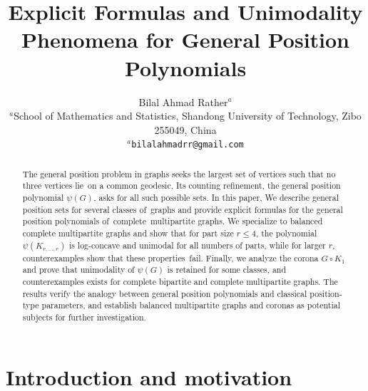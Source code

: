 \documentclass[12pt,twoside]{article}
\title{Explicit Formulas and Unimodality Phenomena for General Position Polynomials}
\author{
	{ Bilal Ahmad Rather$^{a}$} \\[2mm]
	\small $^{a}$School of Mathematics and Statistics, Shandong University of Technology, Zibo 255049, China\\
	$^{a}$\texttt{bilalahmadrr@gmail.com}
}
\date{}
\begin{document}
	\pagestyle{myheadings} 
\maketitle
	

	
	\begin{abstract}
		The general position problem in graphs seeks the largest set of vertices such that no three vertices lie on a common geodesic. Its counting refinement, the general position polynomial $\psi(G)$, asks for all such possible sets. In this paper, We describe general position sets for several classes of graphs and provide explicit formulas for the general position polynomials of complete multipartite graphs. We specialize to balanced complete multipartite graphs and show that for part size $r\le 4$, the polynomial $\psi(K_{r,\dots,r})$ is log-concave and unimodal for all numbers of parts, while for larger $r$, counterexamples show that these properties fail. Finally, we analyze the corona $G\circ K_1$ and prove that unimodality of $\psi(G)$ is retained for some classes, and counterexamples exists for complete bipartite and complete multipartite graphs. The results verify the analogy between general position polynomials and classical position-type parameters, and establish balanced multipartite graphs and coronas as potential subjects for further investigation.
	\end{abstract}
	
	
	\vskip 3mm
	
	
	\vskip 3mm
\section{Introduction and motivation}
\end{document}
